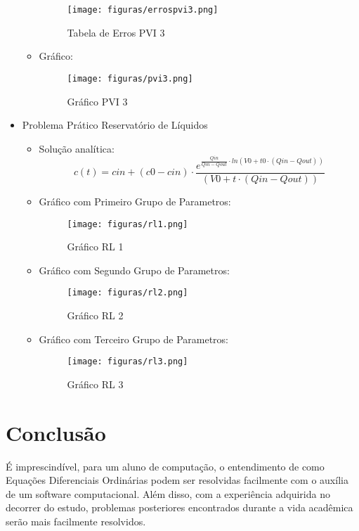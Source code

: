 \documentclass[
	12pt,				%
    oneside,			%
	a4paper,			%
	english,			%
	french,				%
	spanish,			%
	brazil,				%
	]{abntex2}
\begin{document}
\begin{itemize}
\begin{itemize}
\begin{figure}[!htb]
     \centering
     \texttt{[image: figuras/errospvi3.png]}
     \caption{Tabela de Erros PVI 3}
     \label{Tabela de Erros PVI 3}
\end{figure}
\newpage
\item Gráfico:
	\begin{figure}[!htb]
     \centering
     \texttt{[image: figuras/pvi3.png]}
     \caption{Gráfico PVI 3}
     \label{Gráfico PVI 3}
\end{figure}
	\end{itemize}
	\newpage
	\item Problema Prático Reservatório de Líquidos
	\begin{itemize}
	\item Solução analítica: \begin{equation} c(t) = cin + (c0 - cin) \cdot \frac{e^{\frac{Qin}{Qin - Qout} \cdot ln (V0 + t0 \cdot (Qin - Qout))}}{ (V0 + t \cdot (Qin - Qout))} \end{equation}
	\item Gráfico com Primeiro Grupo de Parametros:
	\begin{figure}[!htb]
     \centering
     \texttt{[image: figuras/rl1.png]}
     \caption{Gráfico RL 1}
     \label{Gráfico RL 1}
\end{figure}
	\item Gráfico com Segundo Grupo de Parametros:
	\begin{figure}[!htb]
     \centering
     \texttt{[image: figuras/rl2.png]}
     \caption{Gráfico RL 2}
     \label{Gráfico RL 2}
\end{figure}
\newpage
\item Gráfico com Terceiro Grupo de Parametros:
	\begin{figure}[!htb]
     \centering
     \texttt{[image: figuras/rl3.png]}
     \caption{Gráfico RL 3}
     \label{Gráfico RL 3}
\end{figure}
	\end{itemize}
		
	\end{itemize}	
	


\chapter*[Conclusão]{Conclusão}

É imprescindível, para um aluno de computação, o entendimento de como Equações Diferenciais Ordinárias podem ser resolvidas facilmente com o auxília de um software computacional. Além disso, com a experiência adquirida no decorrer do estudo, problemas posteriores encontrados durante a vida acadêmica serão mais facilmente resolvidos.
\end{document}
